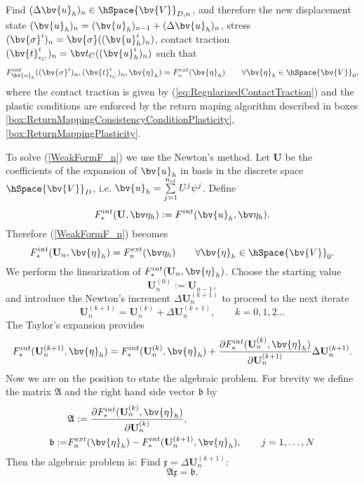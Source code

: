 Find $(\Delta \bv{u}_h)_{n} \in \hSpace{\bv{V}}_{D,n}$, and therefore the new displacement state $(\bv{u}_h)_{n}=(\bv{u}_h)_{n-1} + (\Delta \bv{u}_{h})_{n}$, stress $(\bv{\sigma}^i)_{n}=\bv{\sigma}((\bv{u}_{h}^i)_n)$, contact traction $(\bv{t}_{\epsilon_C}^i)_{n} = \bv t_C((\bv{u}_{h}^i)_n)$ such that
\begin{equation} \label{WeakFormF_n}
F^{int}_{\bv{u}_h}((\bv{\sigma}^i)_{n},(\bv{t}_{\epsilon_C}^i)_{n},\bv{\eta}_h) = F^{ext}_{n}(\bv{\eta}_h) \qquad \forall \bv{\eta}_h \in \hSpace{\bv{V}}_0,
\end{equation}
where the contact traction is given by (\ref{eq:RegularizedContactTraction}) and the plastic conditions are enforced by the return maping algorithm described in boxes \ref{box:ReturnMappingConsistencyConditionPlasticity}, \ref{box:ReturnMappingPlasticity}.

To solve (\ref{WeakFormF_n}) we use the Newton's method. Let $\mathbf{U}$ be the coefficients of the expansion of $\bv{u}_{h}$ in basis in the discrete space $\hSpace{\bv{V}}_D$, i.e. $\bv{u}_{h} = \sum \limits_{j=1}^ {n_{el}} U^j \psi^j$. Define
\[
F^{int}_*(\mathbf{U},\bv\eta_h) := F^{int}(\bv{u}_{h},\bv\eta_h).
\]
Therefore (\ref{WeakFormF_n}) becomes
\begin{equation*} \label{WeakFormF_nU}
F^{int}_*(\mathbf{U}_{n} ,\bv{\eta}_h) = F^{ext}_{n}(\bv\eta_h) \qquad \forall \bv{\eta}_h \in \hSpace{\bv{V}}_0.
\end{equation*}
We perform the linearization of $F^{int}_*(\mathbf{U}_{n} ,\bv{\eta}_h)$. Choose the starting value 
\[
\mathbf{U}^{(0)}_{n} := \mathbf{U}_{n-1},
\]
and introduce the Newton's increment $\Delta \mathbf{U}^{(k+1)}_{n}$ to proceed to the next iterate 
\[
\mathbf{U}^{(k+1)}_{n} = \mathbf{U}^{(k)}_{n} + \Delta \mathbf{U}^{(k+1)}_{n}, \qquad k=0,1,2 \dots
\]
The Taylor's expansion provides
\begin{equation*} \label{Taylor}
F^{int}_*(\mathbf{U}^{(k+1)}_{n} ,\bv{\eta}_h) = F^{int}_*(\mathbf{U}^{(k)}_{n} ,\bv{\eta}_h) + \dfrac{\partial F^{int}_* (\mathbf{U}^{(k)}_{n} ,\bv{\eta}_h)}{\partial \mathbf{U}^{(k+1)}_{n}} \Delta \mathbf{U}^{(k+1)}_{n}.
\end{equation*}
Now we are on the position to state the algebraic problem. For brevity we define the matrix ${\mathfrak A}$ and the right hand side vector ${\mathfrak b}$ by
\begin{align*}
&\mathfrak  A := \dfrac{\partial F^{int}_* (\mathbf{U}^{(k)}_{n} ,\bv{\eta}_h)}{\partial \mathbf{U}^{(k)}_{n}}, \\
{\mathfrak b} := &F^{ext}_{n}(\bv{\eta}_h) - F^{int}_*(\mathbf{U}^{(k+1)}_{n}, \bv{\eta}_h), \qquad j=1,\dots,N
\end{align*}
Then the algebraic problem is: Find $\mathfrak x = \Delta \mathbf{U}^{(k+1)}_{n}$:
\[
\mathfrak  A \mathfrak x = {\mathfrak b}.
\]

